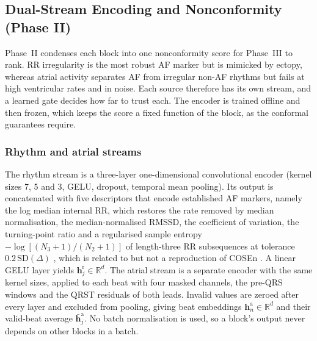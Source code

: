 \documentclass[preprint,12pt]{elsarticle}
\newcommand{\1}{\mathbf{1}}
\begin{document}
\subsection{Dual-Stream Encoding and Nonconformity (Phase II)}
\label{sec:phase2}
Phase~II condenses each block into one nonconformity score for Phase~III to rank. RR irregularity is the most robust AF marker but is mimicked by ectopy, whereas atrial activity separates AF from irregular non-AF rhythms but fails at high ventricular rates and in noise. Each source therefore has its own stream, and a learned gate decides how far to trust each. The encoder is trained offline and then frozen, which keeps the score a fixed function of the block, as the conformal guarantees require.

\subsubsection{Rhythm and atrial streams}
The rhythm stream is a three-layer one-dimensional convolutional encoder (kernel sizes 7, 5 and 3, GELU, dropout, temporal mean pooling). Its output is concatenated with five descriptors that encode established AF markers, namely the log median internal RR, which restores the rate removed by median normalisation, the median-normalised RMSSD, the coefficient of variation, the turning-point ratio and a regularised sample entropy $-\log[(N_3+1)/(N_2+1)]$ of length-three RR subsequences at tolerance $0.2\,\mathrm{SD}(\Delta)$ \cite{richman2000sampen}, which is related to but not a reproduction of COSEn \cite{lake2011cosen}. A linear GELU layer yields $\bm h^{\mathrm r}_j\in\mathbb R^d$. The atrial stream is a separate encoder with the same kernel sizes, applied to each beat with four masked channels, the pre-QRS windows and the QRST residuals of both leads. Invalid values are zeroed after every layer and excluded from pooling, giving beat embeddings $\bm h^{\mathrm a}_n\in\mathbb R^d$ and their valid-beat average $\bar{\bm h}^{\mathrm a}_j$. No batch normalisation is used, so a block's output never depends on other blocks in a batch.
\end{document}
